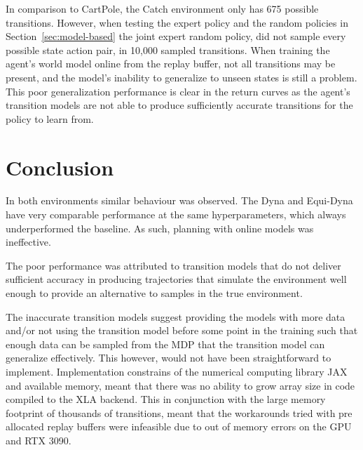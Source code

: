 In comparison to CartPole, the Catch environment only has 675 possible transitions. However, when testing the expert policy and the random policies in Section~\ref{sec:model-based} the joint expert random policy, did not sample every possible state action pair, in 10,000 sampled transitions. When training the agent's world model online from the replay buffer, not all transitions may be present, and the model's inability to generalize to unseen states is still a problem. This poor generalization performance is clear in the return curves as the agent's transition models are not able to produce sufficiently accurate transitions for the policy to learn from.


\section{Conclusion}
In both environments similar behaviour was observed. The Dyna and Equi-Dyna have very comparable performance at the same hyperparameters, which always underperformed the baseline. As such, planning with online models was ineffective.

The poor performance was attributed to transition models that do not deliver sufficient accuracy in producing trajectories that simulate the environment well enough to provide an alternative to samples in the true environment.

The inaccurate transition models suggest providing the models with more data and/or not using the transition model before some point in the training such that enough data can be sampled from the MDP that the transition model can generalize effectively. This however, would not have been straightforward to implement. Implementation constrains of the numerical computing library JAX and available memory, meant that there was no ability to grow array size in code compiled to the XLA backend. This in conjunction with the large memory footprint of thousands of transitions, meant that the workarounds tried with pre allocated replay buffers were infeasible due to out of memory errors on the GPU and RTX 3090.

